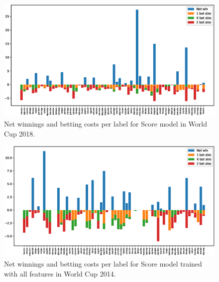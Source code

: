 \begin{figure}[H]
    \centering
    \includegraphics[width=1\textwidth]{img/match_level_2018_score_win_cost_.eps}
    \caption{Net winnings and betting costs per label for Score model in World Cup 2018.}
    \label{fig:net_win_cost_2018}
\end{figure}

\begin{figure}[H]
    \centering
    \includegraphics[width=1\textwidth]{img/match_level_2014_score_win_cost_.eps}
    \caption{Net winnings and betting costs per label for Score model trained with all features in World Cup 2014.}
    \label{fig:net_win_cost_2014}
\end{figure}